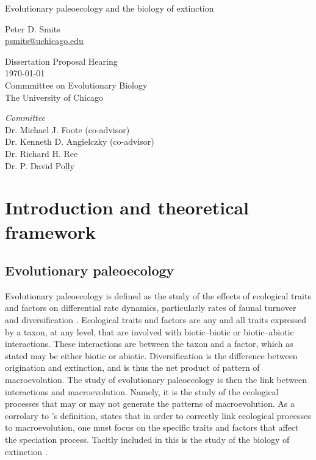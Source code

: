 \documentclass[12pt,letterpaper]{article}
\begin{document}
\setcounter{secnumdepth}{0}

\begin{titlepage}
  \begin{center}
    \huge{Evolutionary paleoecology and the biology of extinction}

    \vspace{1.5cm}

    \large{Peter D. Smits \\}
    \footnotesize{\href{mailto:psmits@uchicago.edu}{psmits@uchicago.edu}}

    \vspace{1.5cm}

    Dissertation Proposal Hearing \\
    \today \\
    Commmittee on Evolutionary Biology \\
    The University of Chicago

    \vspace{1.5cm}

    \textit{Committee} \\
    Dr. Michael J. Foote (co-advisor) \\
    Dr. Kenneth D. Angielczky (co-advisor) \\
    Dr. Richard H. Ree \\
    Dr. P. David Polly
  \end{center}
\end{titlepage}

\linenumbers
\modulolinenumbers[2]


\section{Introduction and theoretical framework}

\subsection{Evolutionary paleoecology}
Evolutionary paleoecology is defined as the study of the effects of ecological traits and factors on differential rate dynamics, particularly rates of faunal turnover and diversification \citep{Kitchell1985a}.
Ecological traits and factors are any and all traits expressed by a taxon, at any level, that are involved with biotic--biotic or biotic--abiotic interactions. These interactions are between the taxon and a factor, which as stated may be either biotic or abiotic.
Diversification is the difference between origination and extinction, and is thus the net product of pattern of macroevolution.
The study of evolutionary paleoecology is then the link between interactions and macroevolution. Namely, it is the study of the ecological processes that may or may not generate the patterns of macroevolution.
As a corrolary to \citet{Kitchell1985a}'s definition, \citet{Allmon1994} states that in order to correctly link ecological processes to macroevolution, one must focus on the specific traits and factors that affect the speciation process. Tacitly included in this is the study of the biology of extinction \citep{Kitchell1990}. %
\end{document}
